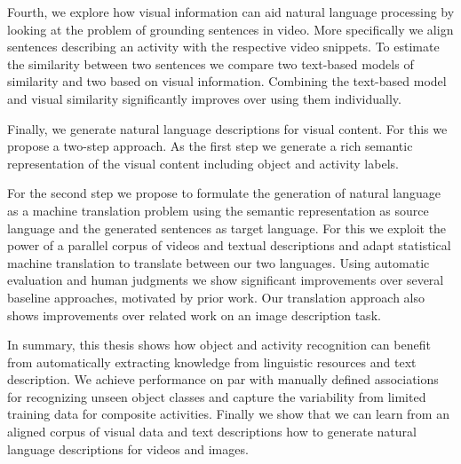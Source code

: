 Fourth, we explore how visual information can aid natural language processing by looking at the problem of grounding sentences in video. More specifically we align sentences describing an activity with the respective video snippets. To estimate the similarity between two sentences we compare two text-based models of similarity and two based on visual information. Combining the text-based model and visual similarity significantly improves over using them individually.

Finally, we generate natural language descriptions for visual content. For this we propose a two-step approach. As the first step we generate a rich semantic representation of the visual content including  object and activity labels.  

For the second step we propose to formulate the generation of natural language as a machine translation problem using the semantic representation as source language and the generated sentences as target language. For this we exploit the power of a parallel corpus of videos and textual descriptions and adapt statistical machine translation to translate between our two languages. Using automatic evaluation and human judgments we show significant improvements over several baseline approaches, motivated by prior work. Our translation approach also shows improvements over related work on an image description task.

In summary, this thesis shows how object and activity recognition can benefit from automatically extracting knowledge from linguistic resources and text description. We achieve performance on par with manually defined associations for recognizing unseen object classes and capture the variability from limited training data for composite activities. Finally we show that we can learn from an aligned corpus of visual data and text descriptions how to generate natural language descriptions for videos and images.